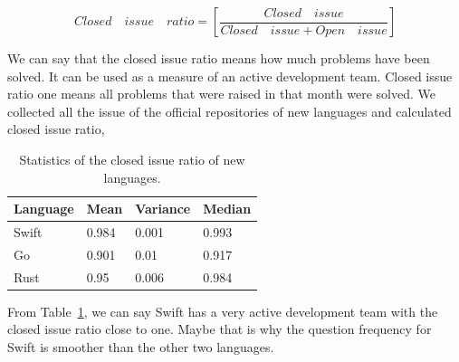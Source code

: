 \begin{equation}
{Closed \quad issue \quad ratio=}
\left[\dfrac{Closed\quad issue}
{Closed\quad issue+Open\quad issue}\right]
\label{eq:Closed Issue Ratio}
\end{equation}

We can say that the closed issue ratio means how much problems have been solved. It can be used as a measure of an active development team. Closed issue ratio one means all problems that were raised in that month were solved. We collected all the issue of the official repositories of new languages and calculated closed issue ratio,

\begin{table}[]

\begin{tabular}{|l|l|l|l|}
\hline
 Language& Mean& Variance& Median\\ \hline
 Swift &  0.984  & 0.001 & 0.993 \\ \hline
 Go    &  0.901  & 0.01  & 0.917 \\ \hline
 Rust  &  0.95   & 0.006 & 0.984 \\ \hline

\end{tabular}%

\caption{Statistics of the closed issue ratio of new  languages.}
\label{table:Issue ratio}
\end{table}
From Table~\ref{table:Issue ratio}, we can say Swift has a very active development team with the closed issue ratio close to one. Maybe that is why the question frequency for Swift is smoother than the other two languages.
\fi

